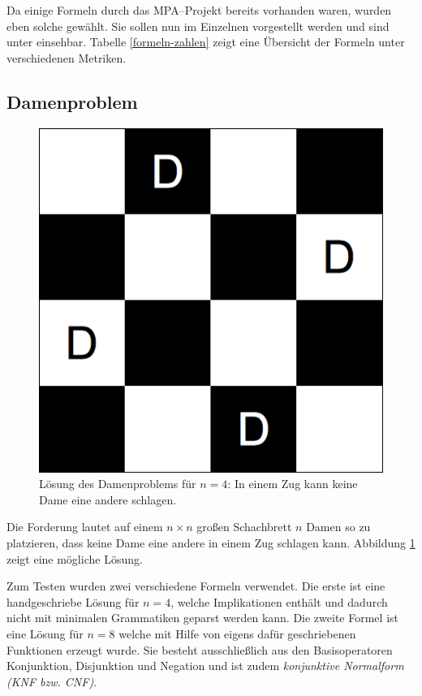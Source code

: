 \documentclass[ngerman,a4paper,abstracton,open=right,twoside=false,toc=listofnumbered,bibtotocnumbered]{scrreprt}
\begin{document}
Da einige Formeln durch das MPA--Projekt bereits vorhanden waren, wurden eben solche gewählt. Sie sollen nun im Einzelnen vorgestellt werden und sind unter \cite{lw-formeln} einsehbar. Tabelle \ref{formeln-zahlen} zeigt eine Übersicht der Formeln unter verschiedenen Metriken.

\subsection{Damenproblem}

\begin{figure}[ht]
	\begin{center}
		\includegraphics[scale=0.5]{img/four-queens}
	\end{center}
	\caption{\label{four-queens} Lösung des Damenproblems für $n = 4$: In einem Zug kann keine Dame eine andere schlagen.}
\end{figure}

Die Forderung lautet auf einem $n \times n$ großen Schachbrett $n$ Damen so zu platzieren, dass keine Dame eine andere in einem Zug schlagen kann. Abbildung \ref{four-queens} zeigt eine mögliche Lösung.

Zum Testen wurden zwei verschiedene Formeln verwendet. Die erste ist eine handgeschriebe Lösung für $n = 4$, welche Implikationen enthält und dadurch nicht mit minimalen Grammatiken geparst werden kann. Die zweite Formel ist eine Lösung für $n = 8$ welche mit Hilfe von eigens dafür geschriebenen Funktionen erzeugt wurde. Sie besteht ausschließlich aus den Basisoperatoren Konjunktion, Disjunktion und Negation und ist zudem \emph{konjunktive Normalform (KNF bzw. CNF)}.
\end{document}
